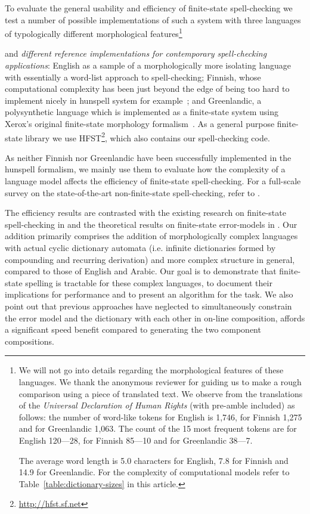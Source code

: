 \documentclass[11pt]{article}
\begin{document}
To evaluate the general usability and efficiency of finite-state spell-checking
we test a number of possible implementations of such a system
with three languages of typologically different
morphological features\footnote{We will not go into details regarding the morphological
features of these languages. We thank the anonymous reviewer for guiding us
to make a rough comparison using a piece of translated text. We observe from the translations of the
\emph{Universal Declaration of Human Rights} (with pre-amble included) as follows:
the number of word-like tokens for English is 1,746, for Finnish 1,275 and for
Greenlandic 1,063. The count of the 15 most frequent tokens are for English
120---28,
for Finnish 85---10 and for Greenlandic 38---7. 


The average word length is 5.0 characters for English, 7.8 for Finnish and 14.9 for
Greenlandic. For the complexity of computational models refer to 
Table~\ref{table:dictionary-sizes} in this article.}

and \emph{different reference implementations for
contemporary spell-checking applications}: English as a sample of a
morphologically more isolating language with essentially a word-list approach to
spell-checking; Finnish, whose
computational complexity has been just beyond the edge of being too hard to
implement nicely in hunspell system for example~\cite{pitkanen/2006}; and
Greenlandic, a polysynthetic language which is implemented as a
finite-state system using Xerox's original finite-state morphology
formalism~\cite{beesley/2003}. As a general
purpose finite-state library we use HFST\footnote{\url{http://hfst.sf.net}},
which also contains our spell-checking code.

As neither Finnish nor Greenlandic have been successfully
implemented in the hunspell formalism, we mainly use them to evaluate how
the complexity of a language model affects the efficiency of finite-state
spell-checking. For a full-scale survey on the state-of-the-art
non-finite-state spell-checking, refer to .

The efficiency results are contrasted with the existing research on
finite-state spell-checking in  and the theoretical
results on finite-state error-models in . Our addition
primarily comprises the addition of morphologically complex languages with
actual cyclic dictionary automata (i.e. infinite dictionaries formed by
compounding and recurring derivation) and more complex structure in general,
compared to those of English and Arabic. Our goal is to demonstrate that
finite-state spelling is tractable for these complex languages, to document
their implications for performance and to present an algorithm for the task.
We also point out that previous
approaches have neglected to simultaneously constrain the error model and the
dictionary with each other in on-line composition, affords a significant
speed benefit compared to generating the two component compositions.
\end{document}
